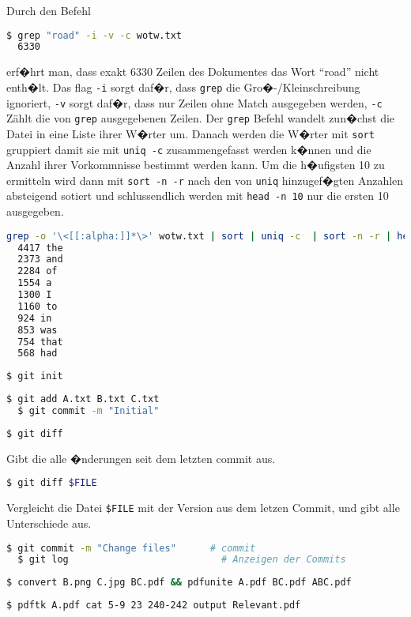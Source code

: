 \documentclass[a4paper,twoside,subproblemsty=arabic,subsubproblemsty=alph,listings,helvet]{homeworkassignment}
\begin{document}
\newsubsubproblem
Durch den Befehl
\begin{lstlisting}[language=bash]
  $ grep "road" -i -v -c wotw.txt
  6330
\end{lstlisting}%
erf�hrt man, dass exakt 6330 Zeilen des Dokumentes das Wort ``road''
nicht enth�lt. Das flag \texttt{-i} sorgt daf�r, dass \texttt{grep} die
Gro�-/Kleinschreibung ignoriert, \texttt{-v} sorgt daf�r, dass nur
Zeilen ohne Match ausgegeben werden, \texttt{-c} Z\"ahlt die von
\texttt{grep} ausgegebenen Zeilen.
\newsubsubproblem
Der \texttt{grep} Befehl wandelt zun�chst die Datei in eine Liste
ihrer W�rter um. Danach werden die W�rter mit \texttt{sort} gruppiert
damit sie mit \texttt{uniq -c} zusammengefasst werden k�nnen und die
Anzahl ihrer Vorkommnisse bestimmt werden kann. Um die h�ufigsten 10
zu ermitteln wird dann mit \texttt{sort -n -r} nach den von
\texttt{uniq} hinzugef�gten Anzahlen absteigend sotiert und
schlussendlich werden mit \texttt{head -n 10} nur die ersten 10 ausgegeben.
\begin{lstlisting}[language=bash]
  grep -o '\<[[:alpha:]]*\>' wotw.txt | sort | uniq -c  | sort -n -r | head -n 10
  4417 the
  2373 and
  2284 of
  1554 a
  1300 I
  1160 to
  924 in
  853 was
  754 that
  568 had
\end{lstlisting}
\newsubproblem[4]
\newsubsubproblem
\begin{lstlisting}[language=bash]
  $ git init
\end{lstlisting}
\newsubsubproblem
\begin{lstlisting}[language=bash]
  $ git add A.txt B.txt C.txt
  $ git commit -m "Initial"
\end{lstlisting}
\newsubsubproblem
\begin{lstlisting}[language=bash]
  $ git diff
\end{lstlisting}
Gibt die alle �nderungen seit dem letzten commit aus. 
\begin{lstlisting}[language=bash]
  $ git diff $FILE
\end{lstlisting}
Vergleicht die Datei \texttt{\${}FILE} mit der Version aus dem letzen
Commit, und gibt alle Unterschiede aus.

\newsubsubproblem
\begin{lstlisting}[language=bash]
  $ git commit -m "Change files"      # commit
  $ git log                           # Anzeigen der Commits
\end{lstlisting}

\newsubproblem
\newsubsubproblem
\begin{lstlisting}[language=bash]
  $ convert B.png C.jpg BC.pdf && pdfunite A.pdf BC.pdf ABC.pdf
\end{lstlisting}

\newsubsubproblem
\begin{lstlisting}[language=bash]
  $ pdftk A.pdf cat 5-9 23 240-242 output Relevant.pdf
\end{lstlisting}
\end{document}
